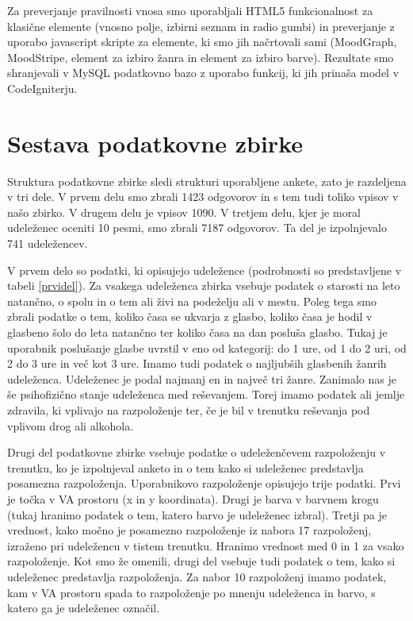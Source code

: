 \documentclass[a4paper, 12pt]{book}
\begin{document}
{Za preverjanje pravilnosti vnosa smo uporabljali HTML5 funkcionalnost za klasične elemente (vnosno polje, izbirni seznam in radio gumbi) in preverjanje z uporabo javascript skripte za elemente, ki smo jih načrtovali sami (MoodGraph, MoodStripe, element za izbiro žanra in element za izbiro barve). Rezultate smo shranjevali v MySQL podatkovno bazo z uporabo funkcij, ki jih prinaša model v CodeIgniterju. 


\section{Sestava podatkovne zbirke}

Struktura podatkovne zbirke sledi strukturi uporabljene ankete, zato je razdeljena v tri dele.  V prvem delu smo zbrali 1423 odgovorov in s tem tudi toliko vpisov v našo zbirko. V drugem delu je vpisov 1090. V tretjem delu, kjer je moral udeleženec oceniti 10 pesmi, smo zbrali 7187 odgovorov. Ta del je izpolnjevalo 741 udeležencev.

V prvem delo so podatki, ki opisujejo udeležence (podrobnosti so predstavljene v tabeli \ref{prvidel}). Za vsakega udeleženca zbirka vsebuje podatek o starosti na leto natančno, o spolu in o tem ali živi na podeželju ali v mestu. Poleg tega smo zbrali podatke o tem, koliko časa se ukvarja z glasbo, koliko časa je hodil v glasbeno šolo do leta natančno ter koliko časa na dan posluša glasbo. Tukaj je uporabnik poslušanje glasbe uvrstil v eno od kategorij: do 1 ure, od 1 do 2 uri, od 2 do 3 ure in več kot 3 ure. Imamo tudi podatek o najljubših glasbenih žanrih udeleženca. Udeleženec je podal najmanj en in največ tri žanre. Zanimalo nas je še psihofizično stanje udeleženca med reševanjem. Torej imamo podatek ali jemlje zdravila, ki vplivajo na razpoloženje ter, če je bil v trenutku reševanja pod vplivom drog ali alkohola. 

Drugi del podatkovne zbirke vsebuje podatke o udeleženčevem razpoloženju v trenutku, ko je izpolnjeval anketo in o tem kako si udeleženec predstavlja posamezna razpoloženja. Uporabnikovo razpoloženje opisujejo trije podatki. Prvi je točka v VA prostoru (x in y koordinata). Drugi je barva v barvnem krogu (tukaj hranimo podatek o tem, katero barvo je  udeleženec izbral). Tretji pa je vrednost, kako močno je posamezno razpoloženje iz nabora 17 razpoloženj, izraženo pri udeležencu v tistem trenutku. Hranimo vrednost med 0 in 1 za vsako razpoloženje. Kot smo že omenili, drugi del vsebuje tudi podatek o tem, kako si udeleženec predstavlja razpoloženja. Za nabor 10 razpoloženj imamo podatek, kam v VA prostoru spada to razpoloženje po mnenju udeleženca in barvo, s katero ga je udeleženec označil. 

}
\end{document}

